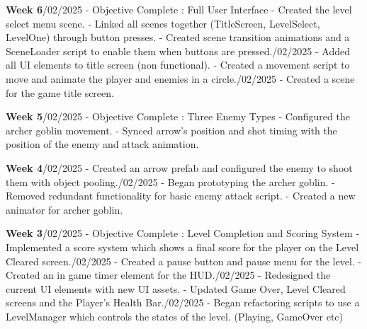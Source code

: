 \documentclass[10pt]{final_report}
\begin{document}
\textbf{Week 6}/02/2025 - Objective Complete : Full User Interface
\newline- Created the level select menu scene.
\newline- Linked all scenes together (TitleScreen, LevelSelect, LevelOne) through button presses.
\newline- Created scene transition animations and a SceneLoader script to enable them when buttons are pressed./02/2025
\newline- Added all UI elements to title screen (non functional).
\newline- Created a movement script to move and animate the player and enemies in a circle./02/2025
\newline- Created a scene for the game title screen.

\textbf{Week 5}/02/2025 - Objective Complete : Three Enemy Types
\newline- Configured the archer goblin movement.
\newline- Synced arrow's position and shot timing with the position of the enemy and attack animation.

\textbf{Week 4}/02/2025
\newline- Created an arrow prefab and configured the enemy to shoot them with object pooling./02/2025
\newline- Began prototyping the archer goblin.
\newline- Removed redundant functionality for basic enemy attack script.
\newline- Created a new animator for archer goblin.

\textbf{Week 3}/02/2025 - Objective Complete : Level Completion and Scoring System
\newline- Implemented a score system which shows a final score for the player on the Level Cleared screen./02/2025
\newline- Created a pause button and pause menu for the level.
\newline- Created an in game timer element for the HUD./02/2025
\newline- Redesigned the current UI elements with new UI assets.
\newline- Updated Game Over, Level Cleared screens and the Player's Health Bar./02/2025
\newline- Began refactoring scripts to use a LevelManager which controls the states of the level. (Playing, GameOver etc)
\end{document}
